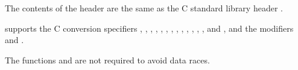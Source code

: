 \pnum
The contents of the header  are the same as the C standard library header .
\begin{footnote}
 supports the C conversion specifiers
, , , , , , ,
, , , , , , and
, and the modifiers  and .
\end{footnote}

\pnum
The functions  and
 are not required to avoid data
races.

